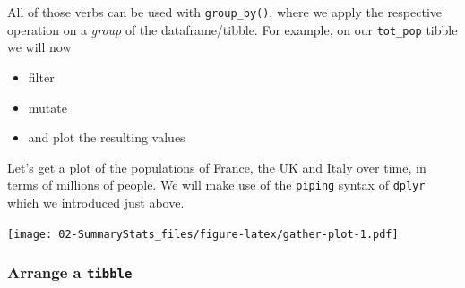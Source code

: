\documentclass[]{book}
\newenvironment{Shaded}{\begin{snugshade}}{\end{snugshade}}
\newcommand{\KeywordTok}[1]{\textcolor[rgb]{0.13,0.29,0.53}{\textbf{#1}}}
\newcommand{\DataTypeTok}[1]{\textcolor[rgb]{0.13,0.29,0.53}{#1}}
\newcommand{\DecValTok}[1]{\textcolor[rgb]{0.00,0.00,0.81}{#1}}
\newcommand{\FloatTok}[1]{\textcolor[rgb]{0.00,0.00,0.81}{#1}}
\newcommand{\StringTok}[1]{\textcolor[rgb]{0.31,0.60,0.02}{#1}}
\newcommand{\CommentTok}[1]{\textcolor[rgb]{0.56,0.35,0.01}{\textit{#1}}}
\newcommand{\OperatorTok}[1]{\textcolor[rgb]{0.81,0.36,0.00}{\textbf{#1}}}
\newcommand{\NormalTok}[1]{#1}
\providecommand{\tightlist}{%
  \setlength{\itemsep}{0pt}\setlength{\parskip}{0pt}}
\begin{document}
All of those verbs can be used with \texttt{group\_by()}, where we apply
the respective operation on a \emph{group} of the dataframe/tibble. For
example, on our \texttt{tot\_pop} tibble we will now

\begin{itemize}
\tightlist
\item
  filter
\item
  mutate
\item
  and plot the resulting values
\end{itemize}

Let's get a plot of the populations of France, the UK and Italy over
time, in terms of millions of people. We will make use of the
\texttt{piping} syntax of \texttt{dplyr} which we introduced just above.

\begin{Shaded}
\end{Shaded}

\texttt{[image: 02-SummaryStats\_files/figure-latex/gather-plot-1.pdf]}

\subsubsection*{\texorpdfstring{Arrange a
\texttt{tibble}}{Arrange a tibble}}\label{arrange-a-tibble}
\end{document}
